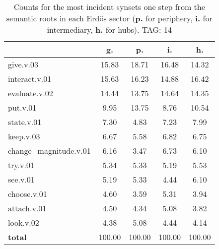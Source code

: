 \begin{table}[h!]
\begin{center}
\begin{tabular}{| l || c | c | c | c |}\hline
 & {\bf g.} & {\bf p.} & {\bf i.} & {\bf h.} \\\hline\hline
give.v.03 & 15.83  & 18.71  & 16.48  & 14.32 \\\hline
interact.v.01 & 15.63  & 16.23  & 14.88  & 16.42 \\\hline
evaluate.v.02 & 14.44  & 13.75  & 14.64  & 14.35 \\\hline
put.v.01 & 9.95  & 13.75  & 8.76  & 10.54 \\\hline
state.v.01 & 7.30  & 4.83  & 7.23  & 7.99 \\\hline
keep.v.03 & 6.67  & 5.58  & 6.82  & 6.75 \\\hline
change\_magnitude.v.01 & 6.16  & 3.47  & 6.73  & 6.10 \\\hline
try.v.01 & 5.34  & 5.33  & 5.19  & 5.53 \\\hline
see.v.01 & 5.19  & 5.33  & 4.44  & 6.10 \\\hline
choose.v.01 & 4.60  & 3.59  & 5.31  & 3.94 \\\hline
attach.v.01 & 4.50  & 4.34  & 5.08  & 3.82 \\\hline
look.v.02 & 4.38  & 5.08  & 4.44  & 4.14 \\\hline\hline
{{\bf total}} & 100.00  & 100.00  & 100.00  & 100.00 \\\hline
\end{tabular}
\caption{Counts for the most incident synsets one step from the semantic roots in each Erd\"os sector ({\bf p.} for periphery, {\bf i.} for intermediary, {\bf h.} for hubs). TAG: 14}
\end{center}
\end{table}